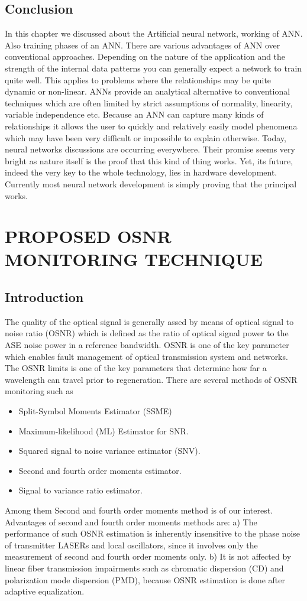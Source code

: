 \documentclass[12pt]{report}
\begin{document}
\section{Conclusion}
In this chapter we discussed about the Artificial neural network, working of ANN. Also training phases of an ANN. There are various advantages of ANN over conventional approaches. Depending on the nature of the application and the strength of the internal data patterns you can generally expect a network to train quite well. This applies to problems where the relationships may be quite dynamic or non-linear. ANNs provide an analytical alternative to conventional techniques which are often limited by strict assumptions of normality, linearity, variable independence etc. Because an ANN can capture many kinds of relationships it allows the user to quickly and relatively easily model phenomena which may have been very difficult or impossible to explain otherwise. Today, neural networks discussions are occurring everywhere. Their promise seems very bright as nature itself is the proof that this kind of thing works. Yet, its future, indeed the very key to the whole technology, lies in hardware development. Currently most neural network development is simply proving that the principal works.


\chapter{PROPOSED OSNR MONITORING TECHNIQUE}
\section{Introduction}
The quality of the optical signal is generally assed by means of optical signal to noise ratio (OSNR) which is defined as the ratio of optical signal power to the ASE noise power in a reference bandwidth. OSNR is one of the key parameter which enables fault management of optical transmission system and networks. The OSNR limits is one of the key parameters that determine how far a wavelength can travel prior to regeneration. There are several methods of OSNR monitoring such as
\begin{itemize}
	\item Split-Symbol Moments Estimator (SSME)
	\item Maximum-likelihood (ML) Estimator for SNR.
	\item Squared signal to noise variance estimator (SNV).
	\item Second and fourth order moments estimator.
	\item Signal to variance ratio estimator.
\end{itemize}
Among them Second and fourth order moments method is of our interest. Advantages of second and fourth order moments methods are:
a) The performance of such OSNR estimation is inherently insensitive to the phase noise of transmitter LASERs and local oscillators, since it involves only the measurement of second and fourth order moments only.
b) It is not affected by linear fiber transmission impairments such as chromatic dispersion (CD) and polarization mode dispersion (PMD), because OSNR estimation is done after adaptive equalization.
\end{document}
